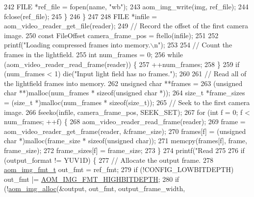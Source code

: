 \begin{DoxyCodeInclude}
{{{{{{242       FILE *ref\_file = fopen(name, \textcolor{stringliteral}{"wb"});
243       aom\_img\_write(img, ref\_file);
244       fclose(ref\_file);
245     \}
246   \}
247 
248   FILE *infile = aom\_video\_reader\_get\_file(reader);
249   \textcolor{comment}{// Record the offset of the first camera image.}
250   \textcolor{keyword}{const} FileOffset camera\_frame\_pos = ftello(infile);
251 
252   printf(\textcolor{stringliteral}{"Loading compressed frames into memory.\(\backslash\)n"});
253 
254   \textcolor{comment}{// Count the frames in the lightfield.}
255   \textcolor{keywordtype}{int} num\_frames = 0;
256   \textcolor{keywordflow}{while} (aom\_video\_reader\_read\_frame(reader)) \{
257     ++num\_frames;
258   \}
259   \textcolor{keywordflow}{if} (num\_frames < 1) die(\textcolor{stringliteral}{"Input light field has no frames."});
260 
261   \textcolor{comment}{// Read all of the lightfield frames into memory.}
262   \textcolor{keywordtype}{unsigned} \textcolor{keywordtype}{char} **frames =
263       (\textcolor{keywordtype}{unsigned} \textcolor{keywordtype}{char} **)malloc(num\_frames * \textcolor{keyword}{sizeof}(\textcolor{keywordtype}{unsigned} \textcolor{keywordtype}{char} *));
264   \textcolor{keywordtype}{size\_t} *frame\_sizes = (\textcolor{keywordtype}{size\_t} *)malloc(num\_frames * \textcolor{keyword}{sizeof}(\textcolor{keywordtype}{size\_t}));
265   \textcolor{comment}{// Seek to the first camera image.}
266   fseeko(infile, camera\_frame\_pos, SEEK\_SET);
267   \textcolor{keywordflow}{for} (\textcolor{keywordtype}{int} f = 0; f < num\_frames; ++f) \{
268     aom\_video\_reader\_read\_frame(reader);
269     frame = aom\_video\_reader\_get\_frame(reader, &frame\_size);
270     frames[f] = (\textcolor{keywordtype}{unsigned} \textcolor{keywordtype}{char} *)malloc(frame\_size * \textcolor{keyword}{sizeof}(\textcolor{keywordtype}{unsigned} \textcolor{keywordtype}{char}));
271     memcpy(frames[f], frame, frame\_size);
272     frame\_sizes[f] = frame\_size;
273   \}
274   printf(\textcolor{stringliteral}{"Read %
275 
276   \textcolor{keywordflow}{if} (output\_format != YUV1D) \{
277     \textcolor{comment}{// Allocate the output frame.}
278     \hyperlink{aom__image_8h_ab71efff8c7f49380fad23b93bc2e9bfc}{aom\_img\_fmt\_t} out\_fmt = ref\_fmt;
279     \textcolor{keywordflow}{if} (!CONFIG\_LOWBITDEPTH) out\_fmt |= \hyperlink{aom__image_8h_a607b37d91f75442f54223ecd85f1b6cb}{AOM\_IMG\_FMT\_HIGHBITDEPTH};
280     \textcolor{keywordflow}{if} (!\hyperlink{aom__image_8h_a570db29fbd122951235a08fe9375f6bb}{aom\_img\_alloc}(&output, out\_fmt, output\_frame\_width,
}}}}}}}
\end{DoxyCodeInclude}
